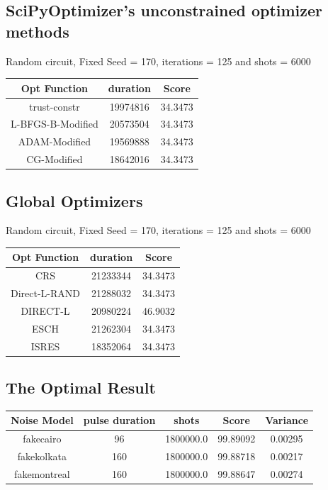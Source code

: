 \documentclass{article}
\begin{document}
\subsection{SciPyOptimizer's unconstrained optimizer methods}  
Random circuit, Fixed Seed = 170, iterations = 125 and shots = 6000
\begin{center}
\scriptsize
\begin{tabular}{||c c c||} 
 \hline
 Opt Function & duration & Score\\ [0.5ex] 
 \hline\hline
trust-constr & 19974816 & 34.3473\\
L-BFGS-B-Modified & 20573504 & 34.3473\\
ADAM-Modified & 19569888 & 34.3473\\
CG-Modified & 18642016 & 34.3473\\ [1ex] 
 \hline

\end{tabular}
\end{center}

\subsection{Global Optimizers}
Random circuit, Fixed Seed = 170, iterations = 125 and shots = 6000
\begin{center}
\scriptsize
\begin{tabular}{||c c c||} 
 \hline
 Opt Function & duration & Score \\ [0.5ex] 
 \hline\hline
CRS & 21233344 & 34.3473 \\
Direct-L-RAND & 21288032  & 34.3473\\
DIRECT-L & 20980224  & 46.9032\\
ESCH & 21262304  & 34.3473\\
ISRES & 18352064  & 34.3473\\[1ex] 
 \hline

\end{tabular}
\end{center}

\subsection{The Optimal Result}

\begin{center}
\scriptsize
\begin{tabular}{||c c c c c||} 
 \hline
 Noise Model & pulse duration & shots & Score & Variance  \\ [0.5ex] 
 \hline\hline
fakecairo & 96 & 1800000.0 & 99.89092 & 0.00295 \\
fakekolkata & 160 & 1800000.0 & 99.88718 & 0.00217 \\
fakemontreal & 160 & 1800000.0 & 99.88647 & 0.00274 \\[1ex] 
 \hline
\end{tabular}
\end{center}
\end{document}
